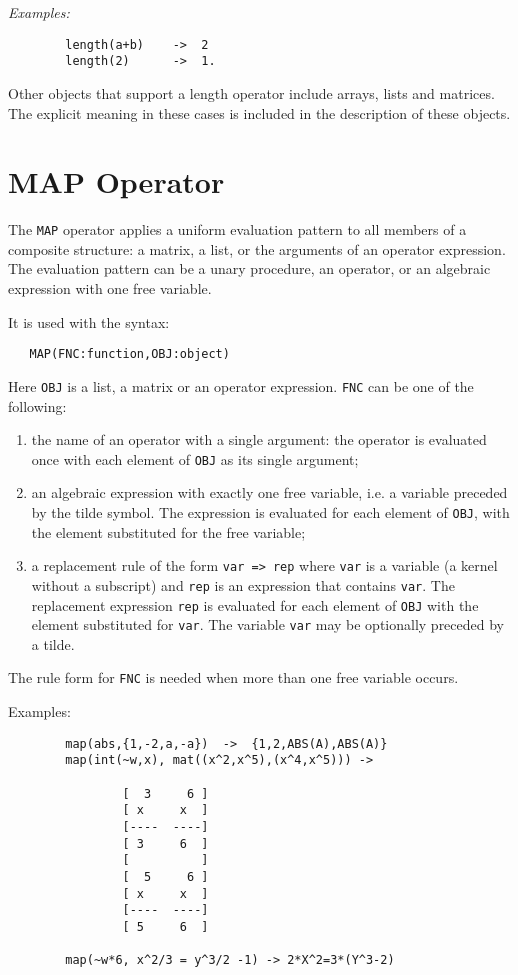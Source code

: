 \textit{Examples:}
\begin{verbatim}
        length(a+b)    ->  2
        length(2)      ->  1.
\end{verbatim}
Other objects that support a length operator include arrays, lists and
matrices. The explicit meaning in these cases is included in the description
of these objects.

\section{MAP Operator}
\hypertarget{operator:MAP}{}

The \texttt{MAP} operator applies a uniform evaluation pattern to all members
of a composite structure: a matrix, a list, or the arguments of an
operator expression.  The evaluation pattern can be a unary procedure, an
operator, or an algebraic expression with one free variable.

It is used with the syntax:
\begin{verbatim}
   MAP(FNC:function,OBJ:object)
\end{verbatim}
Here \texttt{OBJ} is a list, a matrix or an operator expression.
\texttt{FNC} can be one of the following:
\begin{enumerate}
\item the name of an operator with a single argument: the operator
is evaluated once with each element of \texttt{OBJ} as its single argument;
\item an algebraic expression with exactly one free variable, i.e.
a variable preceded by the tilde symbol. The expression
is evaluated for each element of \texttt{OBJ}, with the element
substituted for the free variable;
\item a replacement rule of the form \texttt{var => rep}
where \texttt{var} is a variable (a kernel without a subscript)
and \texttt{rep} is an expression that contains \texttt{var}.
The replacement expression \texttt{rep} is evaluated for each element of 
\texttt{OBJ} with
the element substituted for  \texttt{var}. The variable \texttt{var} may be
optionally preceded by a tilde.
\end{enumerate}
The rule form  for \texttt{FNC} is needed when more than
one free variable occurs.

Examples:
\begin{verbatim}
        map(abs,{1,-2,a,-a})  ->  {1,2,ABS(A),ABS(A)}
        map(int(~w,x), mat((x^2,x^5),(x^4,x^5))) ->

                [  3     6 ]
                [ x     x  ]
                [----  ----]
                [ 3     6  ]
                [          ]
                [  5     6 ]
                [ x     x  ]
                [----  ----]
                [ 5     6  ]

        map(~w*6, x^2/3 = y^3/2 -1) -> 2*X^2=3*(Y^3-2)
\end{verbatim}

